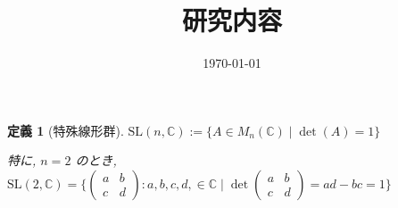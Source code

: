 \documentclass[xelatex,a4paper,ja=standard]{bxjsreport}
\title{研究内容}
\author{}
\date{\today}
\newtheorem{definition}{定義}%
\newtheorem{theorem}[definition]{定理}%
\begin{document}

\begin{definition}[特殊線形群]
    \(\mathrm{SL}(n, \mathbb{C}) := \{ A \in M_n(\mathbb{C}) \mid \det(A) = 1 \}\) \par
    特に, \(n = 2\) のとき, \(\mathrm{SL}(2, \mathbb{C}) = \{\begin{pmatrix} a & b \\ c & d \end{pmatrix} : a, b, c, d, \in \mathbb{C} \mid \det\begin{pmatrix} a & b \\ c & d \end{pmatrix} = ad - bc = 1\}\)
\end{definition}


\end{document}
